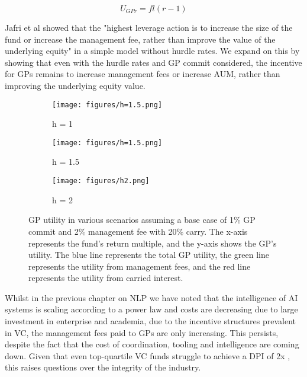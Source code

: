 \documentclass[a4paper, oneside]{discothesis}
\begin{document}
\begin{equation}
U_{GPr} = fl(r-1)
\end{equation}

Jafri et al showed that the "highest leverage action is to increase the size of the fund or increase the management fee, rather than improve the value of the underlying equity" \cite{Jafri_distributed_vc} in a simple model without hurdle rates. We expand on this by showing that even with the hurdle rates and GP commit considered, the incentive for GPs remains to increase management fees or increase AUM, rather than improving the underlying equity value.

\begin{figure}[htbp]
    \centering
    \begin{subfigure}[b]{0.32\textwidth}
      \centering
      \texttt{[image: figures/h=1.5.png]}
      \caption{h = 1}
      \label{fig:h1}
    \end{subfigure}
    \hfill
    \begin{subfigure}[b]{0.32\textwidth}
      \centering
      \texttt{[image: figures/h=1.5.png]}
      \caption{h = 1.5}
      \label{fig:h1.5}
    \end{subfigure}
    \hfill
    \begin{subfigure}[b]{0.32\textwidth}
      \centering
      \texttt{[image: figures/h2.png]}
      \caption{h = 2}
      \label{fig:h2}
    \end{subfigure}
    \caption{GP utility in various scenarios assuming a base case of 1\% GP commit and 2\% management fee with 20\% carry. The x-axis represents the fund's return multiple, and the y-axis shows the GP's utility. The blue line represents the total GP utility, the green line represents the utility from management fees, and the red line represents the utility from carried interest.}
    \label{fig:gp_utility_scenarios}
    \end{figure}

Whilst in the previous chapter on NLP we have noted that the intelligence of AI systems is scaling according to a power law and costs are decreasing due to large investment in enterprise and academia, due to the incentive structures prevalent in VC, the management fees paid to GPs are only increasing. This persists, despite the fact that the cost of coordination, tooling and intelligence are coming down. Given that even top-quartile VC funds struggle to achieve a DPI of 2x \cite{gompers1994riseandfallofvc}, this raises questions over the integrity of the industry. 
\end{document}
